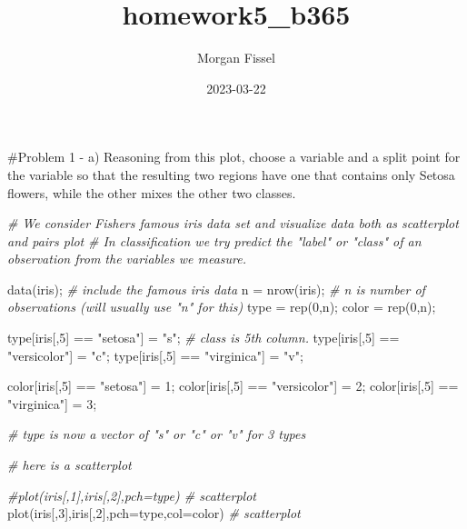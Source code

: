 \documentclass[
]{article}
\title{homework5\_b365}
\author{Morgan Fissel}
\date{2023-03-22}
\newenvironment{Shaded}{\begin{snugshade}}{\end{snugshade}}
\newcommand{\AttributeTok}[1]{\textcolor[rgb]{0.77,0.63,0.00}{#1}}
\newcommand{\CommentTok}[1]{\textcolor[rgb]{0.56,0.35,0.01}{\textit{#1}}}
\newcommand{\DecValTok}[1]{\textcolor[rgb]{0.00,0.00,0.81}{#1}}
\newcommand{\FunctionTok}[1]{\textcolor[rgb]{0.00,0.00,0.00}{#1}}
\newcommand{\NormalTok}[1]{#1}
\newcommand{\OtherTok}[1]{\textcolor[rgb]{0.56,0.35,0.01}{#1}}
\newcommand{\SpecialCharTok}[1]{\textcolor[rgb]{0.00,0.00,0.00}{#1}}
\newcommand{\StringTok}[1]{\textcolor[rgb]{0.31,0.60,0.02}{#1}}
\begin{document}
\maketitle

\#Problem 1 - a) Reasoning from this plot, choose a variable and a split
point for the variable so that the resulting two regions have one that
contains only Setosa flowers, while the other mixes the other two
classes.

\begin{Shaded}
\begin{Highlighting}[]
\CommentTok{\# We consider Fisher\textquotesingle{}s famous iris data set and visualize data both as scatterplot and pairs plot}
\CommentTok{\# In classification we try predict the "label" or "class" of an observation from the variables we measure.}


\FunctionTok{data}\NormalTok{(iris);         }\CommentTok{\# include the famous iris data}
\NormalTok{n }\OtherTok{=} \FunctionTok{nrow}\NormalTok{(iris);     }\CommentTok{\# n is number of observations (will usually use "n" for this)}
\NormalTok{type }\OtherTok{=} \FunctionTok{rep}\NormalTok{(}\DecValTok{0}\NormalTok{,n);}
\NormalTok{color }\OtherTok{=} \FunctionTok{rep}\NormalTok{(}\DecValTok{0}\NormalTok{,n);}

\NormalTok{type[iris[,}\DecValTok{5}\NormalTok{] }\SpecialCharTok{==} \StringTok{"setosa"}\NormalTok{] }\OtherTok{=} \StringTok{"s"}\NormalTok{;      }\CommentTok{\# class is 5th column.  }
\NormalTok{type[iris[,}\DecValTok{5}\NormalTok{] }\SpecialCharTok{==} \StringTok{"versicolor"}\NormalTok{] }\OtherTok{=} \StringTok{"c"}\NormalTok{;}
\NormalTok{type[iris[,}\DecValTok{5}\NormalTok{] }\SpecialCharTok{==} \StringTok{"virginica"}\NormalTok{] }\OtherTok{=} \StringTok{"v"}\NormalTok{;}

\NormalTok{color[iris[,}\DecValTok{5}\NormalTok{] }\SpecialCharTok{==} \StringTok{"setosa"}\NormalTok{] }\OtherTok{=} \DecValTok{1}\NormalTok{;}
\NormalTok{color[iris[,}\DecValTok{5}\NormalTok{] }\SpecialCharTok{==} \StringTok{"versicolor"}\NormalTok{] }\OtherTok{=} \DecValTok{2}\NormalTok{;}
\NormalTok{color[iris[,}\DecValTok{5}\NormalTok{] }\SpecialCharTok{==} \StringTok{"virginica"}\NormalTok{] }\OtherTok{=} \DecValTok{3}\NormalTok{;}


\CommentTok{\# type is now a vector of "s" or "c" or "v" for 3 types}


\CommentTok{\#   here is a scatterplot}

\CommentTok{\#plot(iris[,1],iris[,2],pch=type)  \# scatterplot}
\FunctionTok{plot}\NormalTok{(iris[,}\DecValTok{3}\NormalTok{],iris[,}\DecValTok{2}\NormalTok{],}\AttributeTok{pch=}\NormalTok{type,}\AttributeTok{col=}\NormalTok{color)  }\CommentTok{\# scatterplot}
\end{Highlighting}
\end{Shaded}
\end{document}
